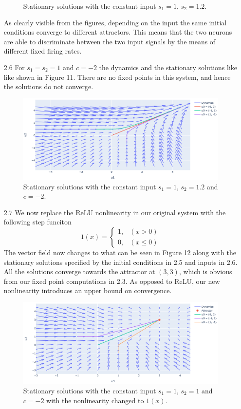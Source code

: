 \documentclass[12pt]{article}
\begin{document}
\begin{enumerate}
\begin{figure}[h]
    \caption{Stationary solutions with the constant input $s_{1}=1$, $s_{2}=1.2$.}
\end{figure} 
As clearly visible from the figures, depending on the input the same initial conditions converge to different attractors. This means that the two neurons 
are able to discriminate between the two input signals by the means of different fixed firing rates.
\item[2.6] For $s_{1}=s_{2}=1$ and $c=-2$ the dynamics and the stationary solutions like like shown in Figure 11. There are 
no fixed points in this system, and hence the solutions do not converge.
\begin{figure}[h]
    \centering
    \includegraphics[width=1.1\textwidth]{Figures/c-2.png}
    \caption{Stationary solutions with the constant input $s_{1}=1$, $s_{2}=1.2$ and $c=-2$.}
\end{figure}  
\item[2.7] We now replace the ReLU nonlinearity in our original system with the following step funciton 
\[
    1(x)=\begin{cases}
        1, & (x>0)\\
        0, & (x\leq 0)
    \end{cases}  
\] 
The vector field now changes to what can be seen in Figure 12 along with the stationary solutions specified by the initial conditions in 2.5 and inputs in 2.6.
All the solutions converge towards the attractor at $(3, 3)$, which is obvious from our fixed point computations in 2.3. As opposed to ReLU, our new
nonlinearity introduces an upper bound on convergence. 
\begin{figure}[h]
    \centering
    \includegraphics[width=1.1\textwidth]{Figures/one.png}
    \caption{Stationary solutions with the constant input $s_{1}=1$, $s_{2}=1$ and $c=-2$ with the nonlinearity changed to $1(x)$.}
\end{figure}  
\end{enumerate}
\end{document}

